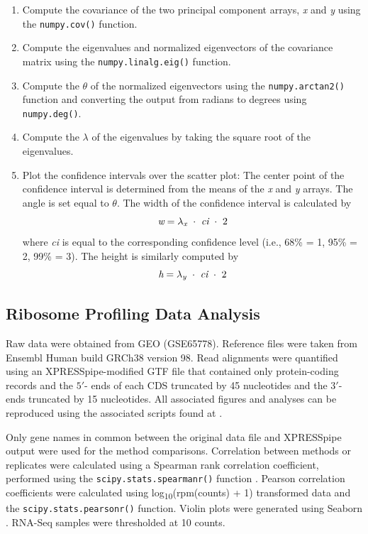 \documentclass[10pt, oneside]{article}
\begin{document}
\begin{enumerate}
  \item Compute the covariance of the two principal component arrays, \textit{x} and \textit{y} using the \texttt{numpy.cov()} function.

  \item Compute the eigenvalues and normalized eigenvectors of the covariance matrix using the \texttt{numpy.linalg.eig()} function.

  \item Compute the $\theta$ of the normalized eigenvectors using the \texttt{numpy.arctan2()} function and converting the output from radians to degrees using \texttt{numpy.deg()}.

  \item Compute the $\lambda$ of the eigenvalues by taking the square root of the eigenvalues.

  \item Plot the confidence intervals over the scatter plot: The center point of the confidence interval is determined from the means of the \textit{x} and \textit{y} arrays. The angle is set equal to $\theta$. The width of the confidence interval is calculated by
  \[
  \textit{w} = \lambda _{\textit{\scriptsize{x}}}\ \cdot\ \textit{ci}\ \cdot\ 2
  \]
  where \textit{ci} is equal to the corresponding confidence level (i.e., 68\% = 1, 95\% = 2, 99\% = 3). The height is similarly computed by
  \[
  \textit{h} = \lambda _{\textit{\scriptsize{y}}}\ \cdot\ \textit{ci}\ \cdot\ 2
  \]
\end{enumerate}

\subsection*{Ribosome Profiling Data Analysis}
Raw data were obtained from GEO (GSE65778). Reference files were taken from Ensembl Human build GRCh38 version 98. Read alignments were quantified using an XPRESSpipe-modified GTF file that contained only protein-coding records and the $5'$- ends of each CDS truncated by 45 nucleotides and the $3'$- ends truncated by 15 nucleotides. All associated figures and analyses can be reproduced using the associated scripts found at \cite{manuscript}. \par

Only gene names in common between the original data file and XPRESSpipe output were used for the method comparisons. Correlation between methods or replicates were calculated using a Spearman rank correlation coefficient, performed using the \texttt{scipy.stats.spearmanr()} function \cite{spearman_rnaseq}. Pearson correlation coefficients were calculated using log\textsubscript{10}(rpm(counts) + 1) transformed data and the \texttt{scipy.stats.pearsonr()} function. Violin plots were generated using Seaborn \cite{seaborn}. RNA-Seq samples were thresholded at 10 counts.\par
\end{document}
